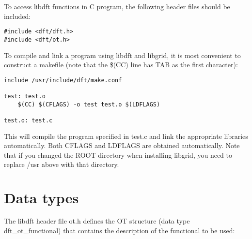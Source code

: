 \documentclass[12pt,letterpaper]{report}
\begin{document}
To access libdft functions in C program, the following header files should be 
included:
\begin{verbatim}
#include <dft/dft.h>
#include <dft/ot.h>
\end{verbatim}

To compile and link a program using libdft and libgrid, it is most convenient 
to construct a makefile (note that the \$(CC) line has TAB as the first 
character):
\begin{verbatim}
include /usr/include/dft/make.conf

test: test.o
    $(CC) $(CFLAGS) -o test test.o $(LDFLAGS)

test.o: test.c
\end{verbatim}
This will compile the program specified in test.c and link the appropriate 
libraries automatically. Both CFLAGS and LDFLAGS are obtained automatically. Note that if you changed the ROOT directory when installing libgrid, you need to replace /usr above with that directory.

\section{Data types}

The libdft header file ot.h defines the OT structure (data type dft\_ot\_functional) that contains the description of the functional to be used:
\end{document}
